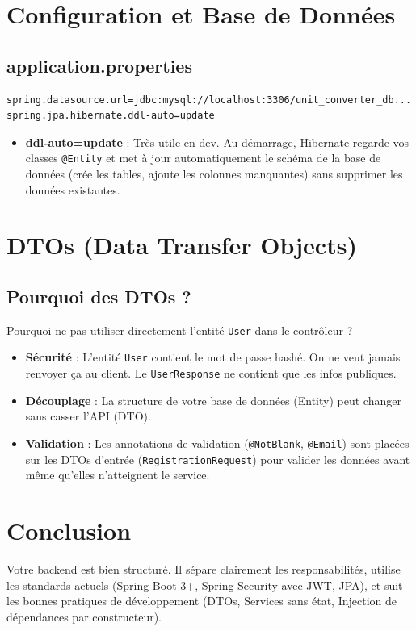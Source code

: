 \documentclass{article}
\begin{document}
\section{Configuration et Base de Données}

\subsection{application.properties}
\begin{lstlisting}
spring.datasource.url=jdbc:mysql://localhost:3306/unit_converter_db...
spring.jpa.hibernate.ddl-auto=update
\end{lstlisting}
\begin{itemize}
    \item \textbf{ddl-auto=update} : Très utile en dev. Au démarrage, Hibernate regarde vos classes \texttt{@Entity} et met à jour automatiquement le schéma de la base de données (crée les tables, ajoute les colonnes manquantes) sans supprimer les données existantes.
\end{itemize}

\section{DTOs (Data Transfer Objects)}

\subsection{Pourquoi des DTOs ?}
Pourquoi ne pas utiliser directement l'entité \texttt{User} dans le contrôleur ?
\begin{itemize}
    \item \textbf{Sécurité} : L'entité \texttt{User} contient le mot de passe hashé. On ne veut jamais renvoyer ça au client. Le \texttt{UserResponse} ne contient que les infos publiques.
    \item \textbf{Découplage} : La structure de votre base de données (Entity) peut changer sans casser l'API (DTO).
    \item \textbf{Validation} : Les annotations de validation (\texttt{@NotBlank}, \texttt{@Email}) sont placées sur les DTOs d'entrée (\texttt{RegistrationRequest}) pour valider les données avant même qu'elles n'atteignent le service.
\end{itemize}

\section{Conclusion}

Votre backend est bien structuré. Il sépare clairement les responsabilités, utilise les standards actuels (Spring Boot 3+, Spring Security avec JWT, JPA), et suit les bonnes pratiques de développement (DTOs, Services sans état, Injection de dépendances par constructeur).
\end{document}
